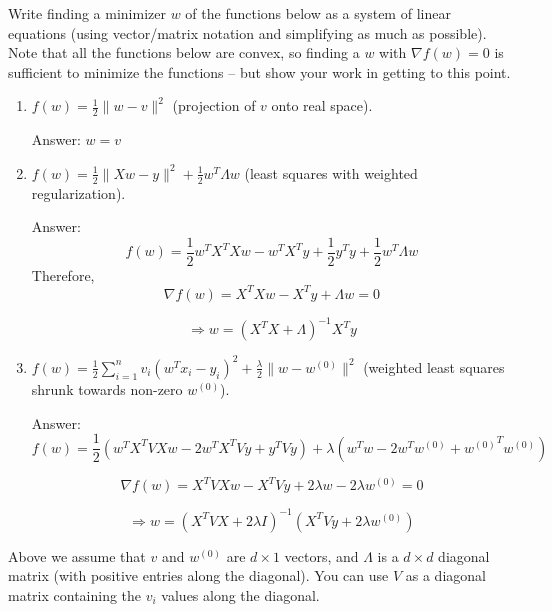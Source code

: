 \documentclass{article}
\newcommand{\blu}[1]{{\textcolor{blu}{#1}}}
\newenvironment{answer}{\par\begingroup\color{gre}Answer: }{\endgroup}
\let\ask\blu
\newcommand{\norm}[1]{\lVert #1 \rVert}
\begin{document}
\ask{Write finding a minimizer $w$ of the functions below as a system of linear equations} (using vector/matrix notation and simplifying as much as possible). Note that all the functions below are convex, so finding a $w$ with $\nabla f(w) = 0$ is sufficient to minimize the functions -- but show your work in getting to this point.

\begin{enumerate}
\item $f(w) = \frac{1}{2} \norm{w-v}^2$ (projection of $v$ onto real space).
\begin{answer}
	$w = v $
\end{answer}
\item $f(w)= \frac{1}{2} \norm{Xw - y}^2 + \frac{1}{2} w^T\Lambda w$ (least squares with weighted regularization).
\begin{answer}
	\begin{equation}
		f(w) = \frac{1}{2} w^{T} X^{T} X w - w^{T} X^{T} y + \frac{1}{2} y^{T} y + \frac{1}{2} w^T\Lambda w
	\end{equation}
	Therefore,
	\begin{equation}
		\nabla f(w) = X^{T} X w - X^{T}y + \Lambda w = 0
	\end{equation}

	\begin{equation}
		\Rightarrow w = (X^{T} X + \Lambda)^{-1} X^{T}y                  
	\end{equation}
\end{answer}

\item $f(w) = \frac{1}{2} \sum_{i=1}^n v_i (w^Tx_i - y_i)^2 + \frac{\lambda}{2}\norm{w-w^{(0)}}^2$ (weighted least squares shrunk towards non-zero $w^{(0)}$). \label{item:weighted-shrunk-ls}
\begin{answer}
	\begin{equation}
		f(w) = \frac{1}{2}(w^{T}X^{T}VXw - 2w^{T}X^{T}Vy + y^{T}Vy)+ \lambda (w^{T} w - 2 w^{T} w^{(0)} + {w^{(0)}}^{T} w^{(0)})
	\end{equation}

	\begin{equation}
		\nabla f(w) = X^{T}VX w - X^{T}Vy + 2\lambda w - 2\lambda w^{(0)} = 0
	\end{equation}

	\begin{equation}
		\Rightarrow w = (X^{T}VX + 2\lambda I)^{-1} (X^{T}Vy + 2\lambda w^{(0)})
	\end{equation}
\end{answer}
\end{enumerate}
Above we assume that $v$ and $w^{(0)}$ are $d \times 1$ vectors, and $\Lambda$ is a $d \times d$ diagonal matrix (with positive entries along the diagonal). You can use $V$ as a diagonal matrix containing the $v_i$ values along the diagonal.
\end{document}
